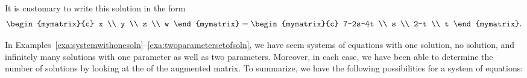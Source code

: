 \begin{solution}
  It is customary to write this solution in the form
  \begin{equation}\label{twoparameters2}
    \begin{mymatrix}{c}
      x \\
      y \\
      z \\
      w
    \end{mymatrix} =\begin{mymatrix}{c}
      7-2s-4t \\
      s \\
      2-t \\
      t
    \end{mymatrix}.
  \end{equation}
\end{solution}

In
Examples~\ref{exa:systemwithonesoln}--\ref{exa:twoparametersetofsoln},
we have seem systems of equations with one solution, no solution, and
infinitely many solutions with one parameter as well as two
parameters. Moreover, in each case, we have been able to determine the
number of solutions by looking at the {\ef} of the augmented matrix.
To summarize, we have the following possibilities for a system of equations:

